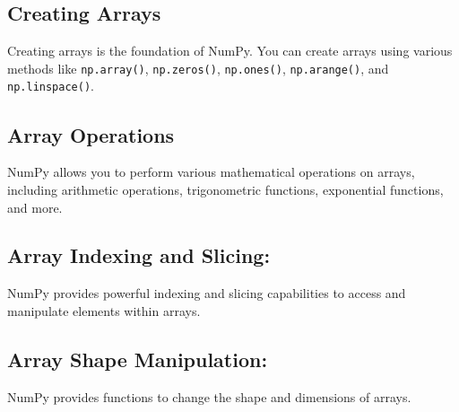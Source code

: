 \subsection{Creating Arrays}

Creating arrays is the foundation of NumPy. You can create arrays using various methods
like \texttt{np.array()}, \texttt{np.zeros()}, \texttt{np.ones()}, \texttt{np.arange()},
and \texttt{np.linspace()}.
\begin{code}
	[H] 
	\caption*{../Code/NumPy/NumPy.py}
	
	\caption{Creating Arrays}
\end{code}

\subsection{Array Operations}

NumPy allows you to perform various mathematical operations on arrays, including
arithmetic operations, trigonometric functions, exponential functions, and more.
\begin{code}
	[H] 
	\caption*{../Code/NumPy/NumPy.py}
	
	\caption{Array Operations}
\end{code}

\subsection{Array Indexing and Slicing:}

NumPy provides powerful indexing and slicing capabilities to access and
manipulate elements within arrays.
\begin{code}
	[H] 
	\caption*{../Code/NumPy/NumPy.py}
	
	\caption{Array Indexing and Slicing}
\end{code}

\subsection{Array Shape Manipulation:}

NumPy provides functions to change the shape and dimensions of arrays.
\begin{code}
	[H] 
	\caption*{../Code/NumPy/NumPy.py}
	
	\caption{Array Shape Manipulation}
\end{code}

